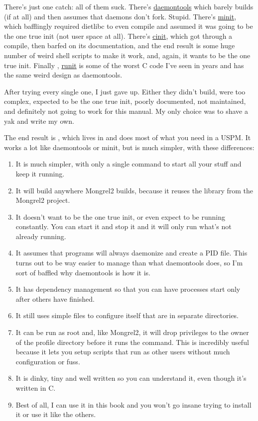 There's just one catch: all of them suck.  There's \href{http://cr.yp.to/daemontools.html}{daemontools}
which barely builds (if at all) and then assumes that daemons don't fork.  Stupid.  There's
\href{http://www.fefe.de/minit/}{minit}, which bafflingly required dietlibc to even compile
and assumed it was going to be the one true init (not user space at all).  There's
\href{http://www.nico.schottelius.org/software/cinit/}{cinit}, which got through a compile,
then barfed on its documentation, and the end result is some huge number of weird
shell scripts to make it work, and, again, it wants to be the one true init.  Finally ,
\href{http://smarden.org/runit/}{runit} is some of the worst C code I've seen in years and
has the same weird design as daemontools.

After trying every single one, I just gave up.  Either they didn't build, were too complex,
expected to be the one true init, poorly documented, not maintained, and definitely not
going to work for this manual.  My only choice was to shave a yak and write my own.

The end result is , which lives in  and does
most of what you need in a USPM.  It works a lot like daemontools or minit, but
is much simpler, with these differences:

\begin{enumerate}
\item It is much simpler, with only a single command to start all your stuff and
    keep it running.
\item It will build anywhere Mongrel2 builds, because it reuses the 
    library from the Mongrel2 project.
\item It doesn't want to be the one true init, or even expect to be running constantly.
    You can start it and stop it and it will only run what's not already running.
\item It assumes that programs will always daemonize and create a PID file.  This turns
    out to be way easier to manage than what daemontools does, so I'm sort of baffled why
    daemontools is how it is.
\item It has dependency management so that you can have processes start only after others
    have finished.
\item It still uses simple files to configure itself that are in separate directories.
\item It can be run as root and, like Mongrel2, it will drop privileges to the owner
    of the profile directory before it runs the command.  This is incredibly useful because
    it lets you setup scripts that run as other users without much configuration or fuss.
\item It is dinky, tiny and well written so you can understand it, even though it's written
    in C.
\item Best of all, I can use it in this book and you won't go insane trying to install it
    or use it like the others.
\end{enumerate}


